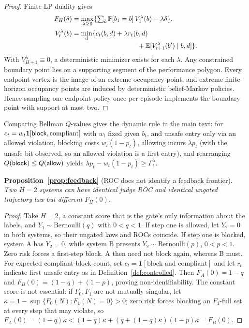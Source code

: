 \begin{proof}
Finite LP duality gives
\[
\begin{aligned}
F_H(\delta)
  &=\max_{\lambda\ge0}\{\textstyle\sum_{b}\Pdist[b_1=b]\,V_1^\lambda(b)-\lambda\delta\},\\
V_t^\lambda(b)
  &=\min_d\{c_t(b,d)+\lambda r_t(b,d)\\[-2pt]
  &\hspace{34mm}+\E[V_{t+1}^\lambda(b')\mid b,d]\}.
\end{aligned}
\]
With $V^\lambda_{H+1}\equiv0$, a deterministic minimizer exists for each $\lambda$. Any constrained boundary
point lies on a supporting segment of the performance polygon. Every endpoint
vertex is the image of an extreme occupancy point, and extreme finite-horizon
occupancy points are induced by deterministic belief-Markov policies. Hence
sampling one endpoint policy once per episode implements the boundary point
with support at most two.
\end{proof}
Comparing Bellman $Q$-values gives the dynamic rule in the main text:
for $c_t=w_t\mathbf 1[\mathsf{block},\text{compliant}]$ with $w_t$ fixed given $b_t$, and unsafe entry only via an
allowed violation, blocking costs $w_t(1-p_t)$, allowing incurs $\lambda p_t$ (with the unsafe bit observed, so an
allowed violation is a first entry), and rearranging
$Q(\mathsf{block})\le Q(\mathsf{allow})$ yields
$\lambda p_t-w_t(1-p_t)\ge\Gamma_t^\lambda$.

\medskip
\noindent\textbf{Proposition~\ref{prop:feedback}} (ROC does not identify a feedback frontier)\textbf{.}
\emph{Two $H=2$ systems can have identical judge ROC and identical ungated trajectory law but different $F_H(0)$.}
\begin{proof}
Take $H=2$, a constant score that is the gate's only information about the labels, and $Y_1\sim\mathrm{Bernoulli}(q)$ with
$0<q<1$. If step one is allowed, let $Y_2=0$ in both systems, so their ungated
laws and ROCs coincide. If step one is blocked, system A has $Y_2=0$, while
system B presents $Y_2\sim\mathrm{Bernoulli}(p)$, $0<p<1$. Zero risk forces a
first-step block. A then need not block again, whereas B must. For expected
compliant-block count, set $c_t=\mathbf{1}[\text{block and compliant}]$ and let
$r_t$ indicate first unsafe entry as in Definition~\ref{def:controlled}. Then
$F_A(0)=1-q$ and
$F_B(0)=(1-q)+(1-p)$, proving non-identifiability. The constant score is not essential: if $F_0,F_1$ are not mutually singular, let $\kappa=1-\sup\{F_0(N):F_1(N)=0\}>0$; zero risk forces blocking an $F_1$-full set at every step that may violate, so $F_A(0)=(1-q)\kappa<(1-q)\kappa+(q+(1-q)\kappa)(1-p)\kappa=F_B(0)$.
\end{proof}

